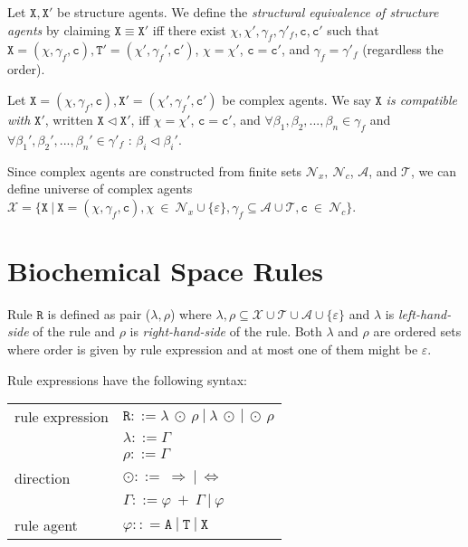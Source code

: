 \documentclass{entcs}
\renewcommand{\~}[0]{\texttildelow}
\begin{document}
\begin{defn}
Let $\mathtt{X},\mathtt{X}'$ be structure agents. We define the \emph{structural equivalence of structure agents} by claiming $\mathtt{X} \equiv \mathtt{X}'$ iff there exist $\chi,\chi',\gamma_f,\gamma'_f, \mathtt{c},\mathtt{c}'$ such that $\mathtt{X}=(\chi, \gamma_f, \mathtt{c}),\mathtt{T}'=(\chi', \gamma_f', \mathtt{c}')$, $\chi=\chi'$, $\mathtt{c} = \mathtt{c}'$, and $\gamma_f=\gamma'_f$ (regardless the order).
\end{defn}

\begin{defn}
Let $\mathtt{X} = (\chi, \gamma_f, \mathtt{c}), \mathtt{X}' = (\chi', \gamma_f', \mathtt{c}')$ be complex agents. We say $\mathtt{X}$ \emph{is compatible with} $\mathtt{X}'$, written $\mathtt{X} \lhd \mathtt{X}'$, iff $\chi=\chi'$, $\mathtt{c} = \mathtt{c}'$, and $\forall \beta_1, \beta_2, ..., \beta_n \in \gamma_f $ and $\forall \beta_1', \beta_2', ..., \beta_n' \in \gamma'_f$ : $\beta_i \lhd \beta_i'$. 
\end{defn}

\begin{theorem}
Since complex agents are constructed from finite sets $\mathcal{N}_{x},~\mathcal{N}_{c}$, $\mathcal{A}$, and $\mathcal{T}$, we can define universe of complex agents $\mathcal{X} = \{ \mathtt{X}~|~\mathtt{X} = (\chi, \gamma_f, \mathtt{c}), \chi~\in~\mathcal{N}_{x} \cup \{\varepsilon\}, \gamma_f \subseteq \mathcal{A} \cup \mathcal{T},  \mathtt{c}~\in~\mathcal{N}_{c} \}$.
\end{theorem}

\section{Biochemical Space Rules}

\begin{definition}
Rule $\mathtt{R}$ is defined as pair ($\lambda, \rho$) where $\lambda, \rho \subseteq \mathcal{X} \cup \mathcal{T} \cup \mathcal{A} \cup \{\varepsilon\}$ and $\lambda$ is \emph{left-hand-side} of the rule and $\rho$ is \emph{right-hand-side} of the rule. Both $\lambda$ and $\rho$ are ordered sets where order is given by rule expression and at most one of them might be $\varepsilon$.
\end{definition}

Rule expressions have the following syntax:

\begin{center}
{\small
\hspace*{-1cm}\begin{tabular}{ l l }
 rule expression & $\mathtt{R} ::= \lambda ~\odot~ \rho ~|~ \lambda ~\odot ~|~ \odot~ \rho $\\
  & $\lambda ::= \Gamma$\\
  & $\rho ::= \Gamma$\\
 direction & $\odot ::=~ \Rightarrow~|~\Leftrightarrow $\\
  & $\Gamma ::= \varphi~ +~\Gamma ~|~ \varphi$\\
 rule agent & $\varphi :: = \mathtt{A}~|~\mathtt{T}~|~\mathtt{X}$\\
\end{tabular}
}
\end{center}
\end{document}
